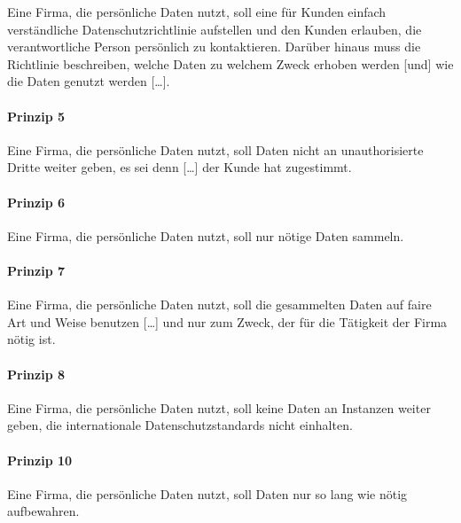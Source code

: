 Eine Firma, die persönliche Daten nutzt, soll eine für Kunden einfach verständliche Datenschutzrichtlinie aufstellen und den Kunden erlauben, die verantwortliche Person persönlich zu kontaktieren.
Darüber hinaus muss die Richtlinie beschreiben, welche Daten zu welchem Zweck erhoben werden [und] wie die Daten genutzt werden [\dots].

\paragraph*{Prinzip 5}

Eine Firma, die persönliche Daten nutzt, soll Daten nicht an unauthorisierte Dritte weiter geben, es sei denn [\dots] der Kunde hat zugestimmt.

\paragraph*{Prinzip 6}

Eine Firma, die persönliche Daten nutzt, soll nur nötige Daten sammeln.

\paragraph*{Prinzip 7}

Eine Firma, die persönliche Daten nutzt, soll die gesammelten Daten auf faire Art und Weise benutzen [\dots] und nur zum Zweck, der für die Tätigkeit der Firma nötig ist.

\paragraph*{Prinzip 8}

Eine Firma, die persönliche Daten nutzt, soll keine Daten an Instanzen weiter geben, die internationale Datenschutzstandards nicht einhalten.

\paragraph*{Prinzip 10}

Eine Firma, die persönliche Daten nutzt, soll Daten nur so lang wie nötig aufbewahren.



